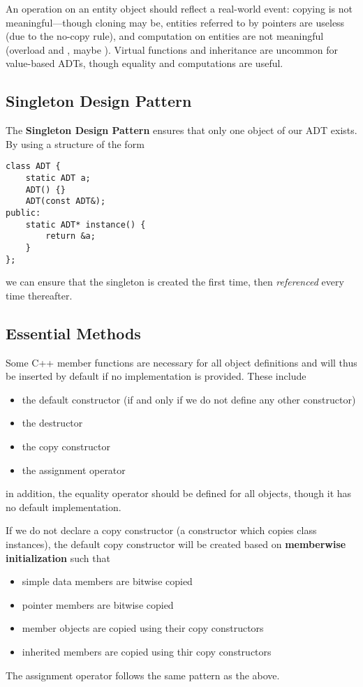 \documentclass[12pt]{article}
\begin{document}
An operation on an entity object should reflect a real-world event: copying is not meaningful---though cloning may be, entities referred to by pointers are useless (due to the no-copy rule), and computation on entities are not meaningful (overload  and , maybe ). Virtual functions and inheritance are uncommon for value-based ADTs, though equality and computations are useful.

\subsection{Singleton Design Pattern}
The {\bf Singleton Design Pattern} ensures that only one object of our ADT exists. By using a structure of the form
\begin{verbatim}
class ADT {
    static ADT a;
    ADT() {}
    ADT(const ADT&);
public:
    static ADT* instance() {
        return &a;
    }
};
\end{verbatim}
we can ensure that the singleton is created the first time, then \emph{referenced} every time thereafter.

\subsection{Essential Methods}
Some C++ member functions are necessary for all object definitions and will thus be inserted by default if no implementation is provided. These include
\begin{itemize}
\item the default constructor (if and only if we do not define any other constructor)
\item the destructor
\item the copy constructor
\item the assignment operator
\end{itemize}
in addition, the equality operator should be defined for all objects, though it has no default implementation.

If we do not declare a copy constructor (a constructor which copies class instances), the default copy constructor will be created based on {\bf memberwise initialization} such that
\begin{itemize}
\item simple data members are bitwise copied
\item pointer members are bitwise copied
\item member objects are copied using their copy constructors
\item inherited members are copied using thir copy constructors
\end{itemize}
The assignment operator follows the same pattern as the above.
\end{document}
